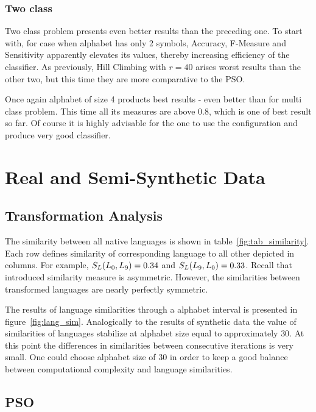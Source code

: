 \documentclass{mini}
\begin{document}
\subsubsection{Two class}
Two class problem presents even better results than the preceding one. To start with, for case when alphabet has only 2 symbols, Accuracy, F-Measure and Sensitivity apparently elevates its values, thereby increasing efficiency of the classifier. As previously, Hill Climbing with $r=40$ arises worst results than the other two, but this time they are more comparative to the PSO. 

Once again alphabet of size 4 products best results - even better than for multi class problem. This time all its measures are above 0.8, which is one of best result so far. Of course it is highly advisable for the one to use the configuration and produce very good classifier.
\makeFigureHCSyntheticTwo

\section{Real and Semi-Synthetic Data}

\subsection{Transformation Analysis}

The similarity between all native languages is shown in table~\ref{fig:tab_similarity}. Each row defines similarity of corresponding language to all other depicted in columns. For example, $S_{L}(L_0,L_9) = 0.34$ and $S_{L}(L_9,L_0) = 0.33$. Recall that introduced similarity measure is asymmetric. However, the similarities between transformed languages are nearly perfectly symmetric.

\makeTableMutualSimilarites

The results of language similarities through a alphabet interval is presented in figure~\ref{fig:lang_sim}. Analogically to the results of synthetic data the value of similarities of languages stabilize at alphabet size equal to approximately $30$. At this point the differences in similarities between consecutive iterations is very small. One could choose alphabet size of $30$ in order to keep a good balance between computational complexity and language similarities.

\makeFigureAvgSimlarity


\subsection{PSO}
\end{document}
